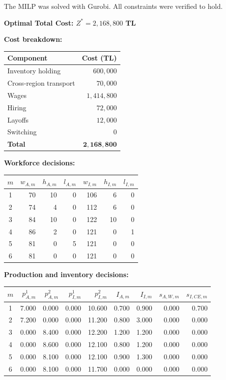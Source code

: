 \documentclass[12pt,a4paper]{article}
\begin{document}
The MILP was solved with Gurobi. All constraints were verified to hold.

\medskip
\textbf{Optimal Total Cost: $Z^*=2{,}168{,}800$ TL}

\medskip
\textbf{Cost breakdown:}

\begin{center}
\begin{tabular}{lr}
\toprule
Component & Cost (TL) \\
\midrule
Inventory holding      & $600{,}000$ \\
Cross-region transport & $70{,}000$ \\
Wages                  & $1{,}414{,}800$ \\
Hiring                 & $72{,}000$ \\
Layoffs                & $12{,}000$ \\
Switching              & $0$ \\
\midrule
\textbf{Total}         & $\mathbf{2{,}168{,}800}$ \\
\bottomrule
\end{tabular}
\end{center}

\medskip
\textbf{Workforce decisions:}

\begin{center}
\begin{tabular}{crrrrrr}
\toprule
$m$ & $w_{A,m}$ & $h_{A,m}$ & $l_{A,m}$ & $w_{I,m}$ & $h_{I,m}$ & $l_{I,m}$ \\
\midrule
1 & 70 & 10 & 0 & 106 &  6 & 0 \\
2 & 74 &  4 & 0 & 112 &  6 & 0 \\
3 & 84 & 10 & 0 & 122 & 10 & 0 \\
4 & 86 &  2 & 0 & 121 &  0 & 1 \\
5 & 81 &  0 & 5 & 121 &  0 & 0 \\
6 & 81 &  0 & 0 & 121 &  0 & 0 \\
\bottomrule
\end{tabular}
\end{center}

\medskip
\textbf{Production and inventory decisions:}

\begin{center}
\begin{tabular}{crrrrrrrr}
\toprule
$m$ & $p^1_{A,m}$ & $p^2_{A,m}$ & $p^1_{I,m}$ & $p^2_{I,m}$
    & $I_{A,m}$ & $I_{I,m}$ & $s_{A,W,m}$ & $s_{I,CE,m}$ \\
\midrule
1 & 7.000 & 0.000 & 0.000 & 10.600 & 0.700 & 0.900 & 0.000 & 0.700 \\
2 & 7.200 & 0.000 & 0.000 & 11.200 & 0.800 & 3.000 & 0.000 & 0.000 \\
3 & 0.000 & 8.400 & 0.000 & 12.200 & 1.200 & 1.200 & 0.000 & 0.000 \\
4 & 0.000 & 8.600 & 0.000 & 12.100 & 0.800 & 1.200 & 0.000 & 0.000 \\
5 & 0.000 & 8.100 & 0.000 & 12.100 & 0.900 & 1.300 & 0.000 & 0.000 \\
6 & 0.000 & 8.100 & 0.000 & 11.700 & 0.000 & 0.000 & 0.000 & 0.000 \\
\bottomrule
\end{tabular}
\end{center}
\end{document}
